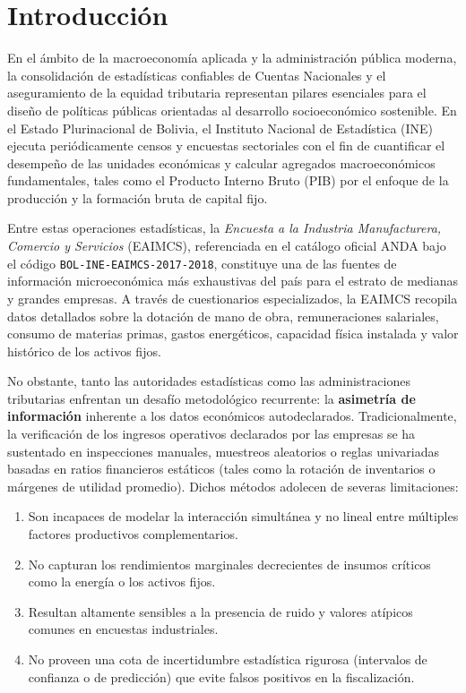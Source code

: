\section{Introducción}
\label{sec:introduccion}

En el ámbito de la macroeconomía aplicada y la administración pública moderna, la consolidación de estadísticas confiables de Cuentas Nacionales y el aseguramiento de la equidad tributaria representan pilares esenciales para el diseño de políticas públicas orientadas al desarrollo socioeconómico sostenible. En el Estado Plurinacional de Bolivia, el Instituto Nacional de Estadística (INE) ejecuta periódicamente censos y encuestas sectoriales con el fin de cuantificar el desempeño de las unidades económicas y calcular agregados macroeconómicos fundamentales, tales como el Producto Interno Bruto (PIB) por el enfoque de la producción y la formación bruta de capital fijo.

Entre estas operaciones estadísticas, la \textit{Encuesta a la Industria Manufacturera, Comercio y Servicios} (EAIMCS), referenciada en el catálogo oficial ANDA bajo el código \texttt{BOL-INE-}\allowbreak\texttt{EAIMCS-}\allowbreak\texttt{2017-2018}, constituye una de las fuentes de información microeconómica más exhaustivas del país para el estrato de medianas y grandes empresas. A través de cuestionarios especializados, la EAIMCS recopila datos detallados sobre la dotación de mano de obra, remuneraciones salariales, consumo de materias primas, gastos energéticos, capacidad física instalada y valor histórico de los activos fijos.

No obstante, tanto las autoridades estadísticas como las administraciones tributarias enfrentan un desafío metodológico recurrente: la \textbf{asimetría de información} inherente a los datos económicos autodeclarados. Tradicionalmente, la verificación de los ingresos operativos declarados por las empresas se ha sustentado en inspecciones manuales, muestreos aleatorios o reglas univariadas basadas en ratios financieros estáticos (tales como la rotación de inventarios o márgenes de utilidad promedio). Dichos métodos adolecen de severas limitaciones:
\begin{enumerate}
    \item Son incapaces de modelar la interacción simultánea y no lineal entre múltiples factores productivos complementarios.
    \item No capturan los rendimientos marginales decrecientes de insumos críticos como la energía o los activos fijos.
    \item Resultan altamente sensibles a la presencia de ruido y valores atípicos comunes en encuestas industriales.
    \item No proveen una cota de incertidumbre estadística rigurosa (intervalos de confianza o de predicción) que evite falsos positivos en la fiscalización.
\end{enumerate}

